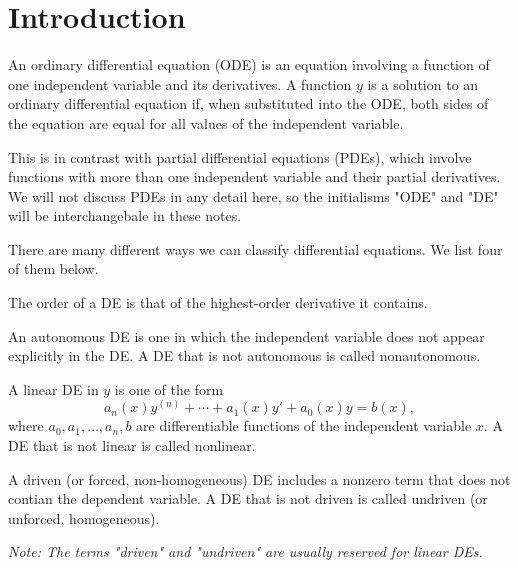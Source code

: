 \documentclass[../m082main.tex]{subfiles}
\begin{document}
\chapter{Introduction}

\begin{definition}
    An ordinary differential equation (ODE) is an equation involving a function of one independent variable and its derivatives.
    A function $y$ is a solution to an ordinary differential equation if, when substituted into the ODE, both sides of the equation are equal for all values of the independent variable.
\end{definition}

This is in contrast with partial differential equations (PDEs), which involve functions with more than one independent variable and their partial derivatives.
We will not discuss PDEs in any detail here, so the initialisms "ODE" and "DE" will be interchangebale in these notes.

There are many different ways we can classify differential equations.
We list four of them below.

\begin{definition}
    The order of a DE is that of the highest-order derivative it contains.
\end{definition}

\begin{definition}
    An autonomous DE is one in which the independent variable does not appear explicitly in the DE.
    A DE that is not autonomous is called nonautonomous.
\end{definition}

\begin{definition}
    A linear DE in $y$ is one of the form
    \[ a_n(x)y^{(n)} + \cdots + a_1(x)y' + a_0(x)y = b(x), \]
    where $a_0, a_1, \ldots, a_n, b$ are differentiable functions of the independent variable $x$.
    A DE that is not linear is called nonlinear.
\end{definition}

\begin{definition}
    A driven (or forced, non-homogeneous) DE includes a nonzero term that does not contian the dependent variable.
    A DE that is not driven is called undriven (or unforced, homogeneous).

    \medskip
    \textit{Note: The terms "driven" and "undriven" are usually reserved for linear DEs.}
\end{definition}
\end{document}
